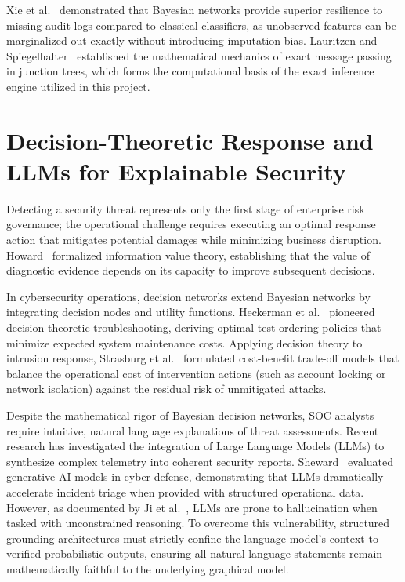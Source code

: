 \documentclass[12pt,a4paper]{report}
\begin{document}
Xie et al.~\cite{xie2010evaluating} demonstrated that Bayesian networks provide superior resilience to missing audit logs compared to classical classifiers, as unobserved features can be marginalized out exactly without introducing imputation bias. Lauritzen and Spiegelhalter~\cite{lauritzen1988local} established the mathematical mechanics of exact message passing in junction trees, which forms the computational basis of the exact inference engine utilized in this project.

\section{Decision-Theoretic Response and LLMs for Explainable Security}
Detecting a security threat represents only the first stage of enterprise risk governance; the operational challenge requires executing an optimal response action that mitigates potential damages while minimizing business disruption. Howard~\cite{howard1966information} formalized information value theory, establishing that the value of diagnostic evidence depends on its capacity to improve subsequent decisions.

In cybersecurity operations, decision networks extend Bayesian networks by integrating decision nodes and utility functions. Heckerman et al.~\cite{heckerman1995decision} pioneered decision-theoretic troubleshooting, deriving optimal test-ordering policies that minimize expected system maintenance costs. Applying decision theory to intrusion response, Strasburg et al.~\cite{strasburg2012bayesian} formulated cost-benefit trade-off models that balance the operational cost of intervention actions (such as account locking or network isolation) against the residual risk of unmitigated attacks.

Despite the mathematical rigor of Bayesian decision networks, SOC analysts require intuitive, natural language explanations of threat assessments. Recent research has investigated the integration of Large Language Models (LLMs) to synthesize complex telemetry into coherent security reports. Sheward~\cite{sheward2023generative} evaluated generative AI models in cyber defense, demonstrating that LLMs dramatically accelerate incident triage when provided with structured operational data. However, as documented by Ji et al.~\cite{ji2023survey}, LLMs are prone to hallucination when tasked with unconstrained reasoning. To overcome this vulnerability, structured grounding architectures must strictly confine the language model's context to verified probabilistic outputs, ensuring all natural language statements remain mathematically faithful to the underlying graphical model.
\end{document}
